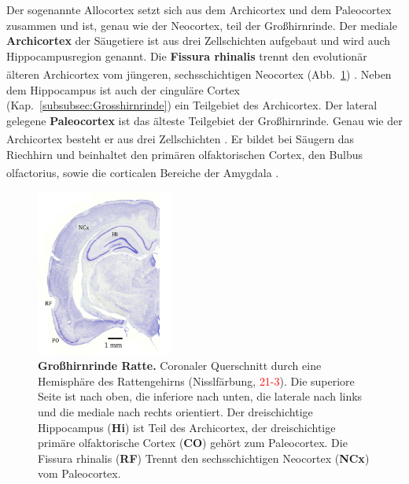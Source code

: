 \documentclass[12pt,a4paper,pdftex]{article}
\begin{document}
Der sogenannte Allocortex setzt sich aus dem Archicortex und dem Paleocortex zusammen und ist, genau wie der Neocortex, teil der Großhirnrinde. Der mediale \textbf{Archicortex} der Säugetiere ist aus drei Zellschichten aufgebaut und wird auch Hippocampusregion genannt. Die \textbf{Fissura rhinalis} trennt den evolutionär älteren Archicortex vom jüngeren, sechsschichtigen Neocortex (Abb.~\ref{fig:allocortex_ratte}) \textsuperscript{\cite[6]{storch2012lehrbuchzoo}}. Neben dem Hippocampus ist auch der cinguläre Cortex (Kap.~\ref{subsubsec:Grosshirnrinde}) ein Teilgebiet des Archicortex. Der lateral gelegene \textbf{Paleocortex} ist das älteste Teilgebiet der Großhirnrinde. Genau wie der Archicortex besteht er aus drei Zellschichten \textsuperscript{\cite[6]{storch2012lehrbuchzoo}}. Er bildet bei Säugern das Riechhirn und beinhaltet den primären olfaktorischen Cortex, den Bulbus olfactorius, sowie die corticalen Bereiche der Amygdala \textsuperscript{\cite[9]{trepel2011neuroanatomie}}.

\begin{figure}[H]
    \centering
    \includegraphics[width=0.4\textwidth]{pictures/Bilder_Jule/Ratte/RF.png}
    \caption[Großhirnrinde Ratte]{\textbf{Großhirnrinde Ratte.} Coronaler Querschnitt durch eine Hemisphäre des Rattengehirns (Nisslfärbung, \textcolor{red}{21-3}). Die superiore Seite ist nach oben, die inferiore nach unten, die laterale nach links und die mediale nach rechts orientiert. Der dreischichtige Hippocampus (\textbf{Hi}) ist Teil des Archicortex, der dreischichtige primäre olfaktorische Cortex (\textbf{CO}) gehört zum Paleocortex. Die Fissura rhinalis (\textbf{RF}) Trennt den sechsschichtigen Neocortex (\textbf{NCx}) vom Paleocortex.}
    \label{fig:allocortex_ratte}
\end{figure}{}
\end{document}
